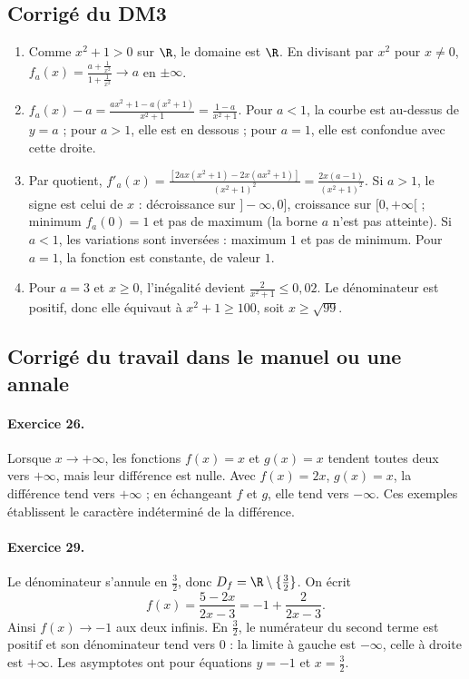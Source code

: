 \subsection{Corrigé du DM3}\begin{enumerate}
\item Comme $x^2+1>0$ sur $\R$, le domaine est $\R$. En divisant par $x^2$ pour $x\ne0$, $f_a(x)=\frac{a+\frac{1}{x^2}}{1+\frac{1}{x^2}}\to a$ en $\pm\infty$.
\item $f_a(x)-a=\frac{ax^2+1-a(x^2+1)}{x^2+1}=\frac{1-a}{x^2+1}$. Pour $a<1$, la courbe est au-dessus de $y=a$ ; pour $a>1$, elle est en dessous ; pour $a=1$, elle est confondue avec cette droite.
\item Par quotient, $f'_a(x)=\frac{[2ax(x^2+1)-2x(ax^2+1)]}{(x^2+1)^2}=\frac{2x(a-1)}{(x^2+1)^2}$.
Si $a>1$, le signe est celui de $x$ : décroissance sur $]-\infty,0]$, croissance sur $[0,+\infty[$ ; minimum $f_a(0)=1$ et pas de maximum (la borne $a$ n'est pas atteinte). Si $a<1$, les variations sont inversées : maximum $1$ et pas de minimum. Pour $a=1$, la fonction est constante, de valeur $1$.
\item Pour $a=3$ et $x\ge0$, l'inégalité devient $\frac{2}{x^2+1}\le0{,}02$. Le dénominateur est positif, donc elle équivaut à $x^2+1\ge100$, soit $x\ge\sqrt{99}$.
\end{enumerate}

\subsection{Corrigé du travail dans le manuel ou une annale}\paragraph{Exercice 26.} Lorsque $x\to+\infty$, les fonctions $f(x)=x$ et $g(x)=x$ tendent toutes deux vers $+\infty$, mais leur différence est nulle. Avec $f(x)=2x$, $g(x)=x$, la différence tend vers $+\infty$ ; en échangeant $f$ et $g$, elle tend vers $-\infty$. Ces exemples établissent le caractère indéterminé de la différence.
\paragraph{Exercice 29.} Le dénominateur s'annule en $\frac32$, donc $D_f=\R\setminus\{\frac32\}$. On écrit
\[f(x)=\frac{5-2x}{2x-3}=-1+\frac2{2x-3}.\]
Ainsi $f(x)\to-1$ aux deux infinis. En $\frac32$, le numérateur du second terme est positif et son dénominateur tend vers $0$ : la limite à gauche est $-\infty$, celle à droite est $+\infty$. Les asymptotes ont pour équations $y=-1$ et $x=\frac32$.

\fi


